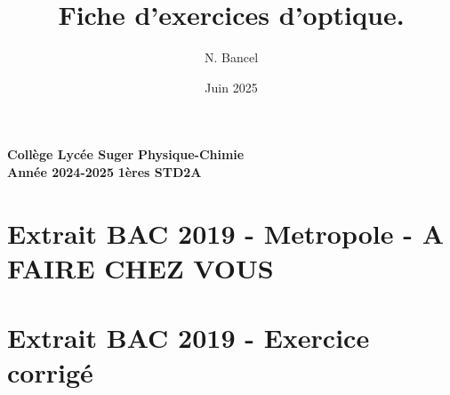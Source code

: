 \documentclass[answers]{exam}
\title{Fiche d'exercices d'optique.}
\author{N. Bancel}
\date{Juin 2025}
\begin{document}
\textbf{Collège Lycée Suger}
\hfill
\textbf{Physique-Chimie} \\

\textbf{Année 2024-2025}
\hfill
\textbf{1ères STD2A} \par

{\let\newpage\relax\maketitle}


\section*{Extrait BAC 2019 - Metropole - A FAIRE CHEZ VOUS}

\begin{figure}[H]
  \centering
\end{figure}


\begin{figure}[H]
  \centering
\end{figure}

\begin{figure}[H]
  \centering
\end{figure}


\section*{Extrait BAC 2019 - Exercice corrigé}

\begin{figure}[H]
  \centering
\end{figure}

\begin{figure}[H]
  \centering
\end{figure}

\begin{figure}[H]
  \centering
\end{figure}
\end{document}
